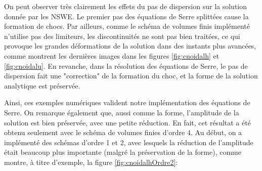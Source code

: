\indent On peut observer très clairement les effets du pas de dispersion sur la solution donnée par les NSWE. Le premier pas des équations de Serre splittées cause la formation de chocs. Par ailleurs, comme le schéma de volumes finis implémenté n'utilise pas des limiteurs, les discontinuités ne sont pas bien traitées, ce qui provoque les grandes déformations de la solution dans des instants plus avancées, comme montrent les dernières images dans les figures \ref{fig:cnoidalh} et \ref{fig:cnoidalu}. En revanche, dans la résolution des équations de Serre, le pas de dispersion fait une "correction" de la formation du choc, et la forme de la solution analytique est préservée.

\indent Ainsi, ces exemples numériques valident notre implémentation des équations de Serre. On remarque également que, aussi comme la forme, l'amplitude de la solution est bien préservée, avec une petite réduction. En fait, cet résultat a été obtenu seulement avec le schéma de volumes finies d'ordre 4. Au début, on a implémenté des schémas d'ordre 1 et 2, avec lesquels la réduction de l'amplitude était beaucoup plus importante (malgré la préservation de la forme), comme montre, à titre d'exemple, la figure \ref{fig:cnoidalhOrdre2}:

